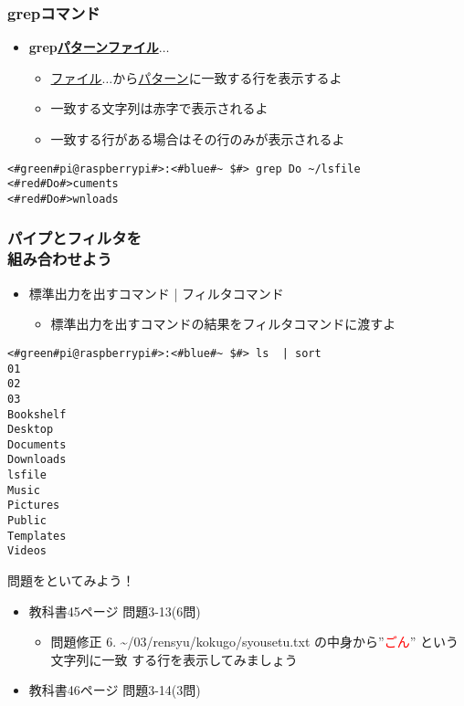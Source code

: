 \begin{frame}[fragile]
    \frametitle{grepコマンド}
    \begin{itemize}
        \item {\bf grep\textvisiblespace\underline{パターン}\textvisiblespace\underline{ファイル}$\ldots$}
        \begin{itemize}
            \small
            \item[] \underline{ファイル}$\ldots$から\underline{パターン}に一致する行を表示するよ
            \item[] 一致する文字列は赤字で表示されるよ
            \item[] 一致する行がある場合はその行のみが表示されるよ
        \end{itemize}
    \end{itemize}
    \begin{lstlisting}[title=grepコマンドの実行例, label=grep_example]
<#green#pi@raspberrypi#>:<#blue#~ $#> grep Do ~/lsfile
<#red#Do#>cuments
<#red#Do#>wnloads
    \end{lstlisting}
\end{frame}

\begin{frame}[fragile]
    \frametitle{パイプとフィルタを\\組み合わせよう}
    \vspace{2em}
    \begin{itemize}
        \item 標準出力を出すコマンド | フィルタコマンド
        \begin{itemize}
            \small
            \item[] 標準出力を出すコマンドの結果をフィルタコマンドに渡すよ
        \end{itemize}
    \end{itemize}
    \begin{lstlisting}[title=パイプラインを用いたsortコマンドの実行例, label=ppsort_example]
<#green#pi@raspberrypi#>:<#blue#~ $#> ls  | sort
01
02
03
Bookshelf
Desktop
Documents
Downloads
lsfile
Music
Pictures
Public
Templates
Videos
    \end{lstlisting}
\end{frame}

\begin{frame}
    \begin{exampleblock}{問題をといてみよう！}
        \begin{itemize}
            \item 教科書45ページ 問題3-13(6問)
            \begin{itemize}
                \item 問題修正 6. \textasciitilde/03/rensyu/kokugo/syousetu.txt の中身から”\textcolor{red}{ごん}” という文字列に一致
                する行を表示してみましょう
            \end{itemize}
            \item 教科書46ページ 問題3-14(3問)
        \end{itemize}
    \end{exampleblock} 
\end{frame}

